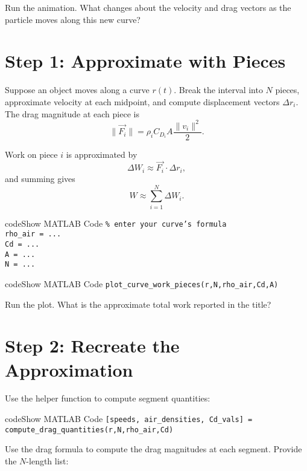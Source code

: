 \documentclass{ximera}
\begin{document}
\begin{problem}
Run the animation. What changes about the velocity and drag vectors as the particle moves along this new curve?
\end{problem}

\section*{Step 1: Approximate with Pieces}

Suppose an object moves along a curve $r(t)$. Break the interval into $N$ pieces, approximate velocity at each midpoint, and compute displacement vectors $\Delta r_i$. The drag magnitude at each piece is
\[
\|\vec{F_i}\| = \rho_i C_{D_i} A \frac{\|v_i\|^2}{2}.
\]

Work on piece $i$ is approximated by
\[
\Delta W_i \approx \vec{F_i}\cdot\Delta r_i,
\]
and summing gives
\[
W \approx \sum_{i=1}^N \Delta W_i.
\]

\begin{expandable}{code}{Show MATLAB Code}
\texttt{\% enter your curve's formula}\\
\texttt{rho\_air = ...}\\
\texttt{Cd = ...}\\
\texttt{A = ...}\\
\texttt{N = ...}
\end{expandable}

\begin{expandable}{code}{Show MATLAB Code}
\texttt{plot\_curve\_work\_pieces(r,N,rho\_air,Cd,A)}
\end{expandable}

\begin{problem}
Run the plot. What is the approximate total work reported in the title?
\end{problem}

\section*{Step 2: Recreate the Approximation}

Use the helper function to compute segment quantities:

\begin{expandable}{code}{Show MATLAB Code}
\texttt{[speeds, air\_densities, Cd\_vals] = compute\_drag\_quantities(r,N,rho\_air,Cd)}
\end{expandable}

\begin{problem}
Use the drag formula to compute the drag magnitudes at each segment. Provide the $N$-length list:
\end{problem}
\end{document}
